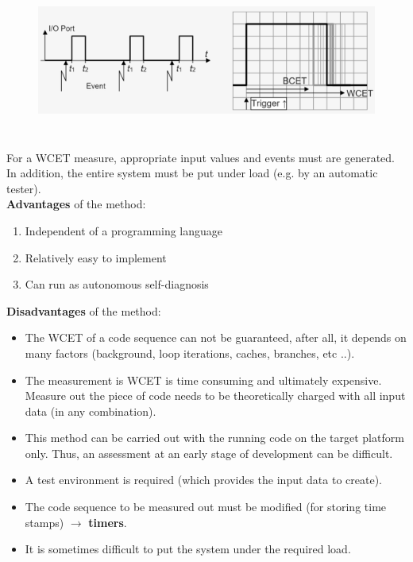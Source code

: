 	\begin{figure}[h]
    \centering
    \includegraphics[width=15cm, height=5cm]{Images/image77.png}
    \label{fig:Fig }
    \end{figure}
    
For a WCET measure, appropriate input values and events must are generated. In addition, the entire system must be put under load (e.g. by an automatic tester).\\

\textbf{Advantages} of the method:

\begin{enumerate}
	\item  Independent of a programming language
	\item  Relatively easy to implement
	\item  Can run as autonomous self-diagnosis
\end{enumerate}

\textbf{Disadvantages} of the method:\\

\begin{itemize}
	\item  The WCET of a code sequence can not be guaranteed, after all, it depends on many factors (background, loop iterations, caches, branches, etc ..).
	\item  The measurement is WCET is time consuming and ultimately expensive. Measure out the piece of code needs to be theoretically charged with all input data (in any combination).
	\item  This method can be carried out with the running code on the target platform only. Thus, an assessment at an early stage of development can be difficult.
	\item  A test environment is required (which provides the input data to create).
	\item  The code sequence to be measured out must be modified (for storing time stamps) $\rightarrow$ \textbf{timers}.
	\item  It is sometimes difficult to put the system under the required load.
\end{itemize}

